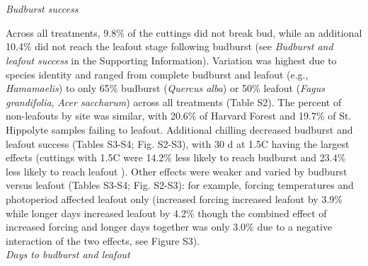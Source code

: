 \documentclass[11pt]{article}
\begin{document}
\vspace{2ex}\\
\vspace{2ex}\\
\emph{Budburst success}

\noindent Across all treatments, 9.8\% of the cuttings did not break bud, while an additional 10.4\% did not reach the leafout stage following budburst (see \emph{Budburst and leafout success} in the Supporting Information). Variation was highest due to species identity and ranged from complete budburst and leafout (e.g., \emph{Hamamaelis}) to only 65\% budburst (\emph{Quercus alba}) or 50\% leafout (\emph{Fagus grandifolia}, \emph{Acer saccharum}) across all treatments (Table S2). The percent of non-leafouts by site was similar, with 20.6\% of Harvard Forest and 19.7\% of St. Hippolyte samples failing to leafout. Additional chilling decreased budburst and leafout success (Tables S3-S4; Fig. S2-S3), with 30 d at 1.5\degree C having the largest effects (cuttings with 1.5\degree C were 14.2\% less likely to reach budburst and 23.4\% less likely to reach leafout ). Other effects were weaker and varied by budburst versus leafout (Tables S3-S4; Fig. S2-S3): for example, forcing temperatures and photoperiod affected leafout only (increased forcing increased leafout by 3.9\% while longer days increased leafout by 4.2\% though the combined effect of increased forcing and longer days together was only 3.0\% due to a negative interaction of the two effects, see Figure S3). \\

\noindent \emph{Days to budburst and leafout}
\end{document}
